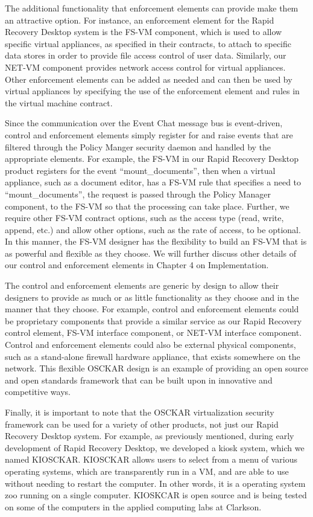 The additional functionality that enforcement elements can provide make them an attractive option. For instance, an enforcement element for the Rapid Recovery Desktop system is the FS-VM component, which is used to allow specific virtual appliances, as specified in their contracts, to attach to specific data stores in order to provide file access control of user data. Similarly, our NET-VM component provides network access control for virtual appliances. Other enforcement elements can be added as needed and can then be used by virtual appliances by specifying the use of the enforcement element and rules in the virtual machine contract.

Since the communication over the Event Chat message bus is event-driven, control and enforcement elements simply register for and raise events that are filtered through the Policy Manger security daemon and handled by the appropriate elements. For example, the FS-VM in our Rapid Recovery Desktop product registers for the event ``mount\_documents'', then when a virtual appliance, such as a document editor, has a FS-VM rule that specifies a need to ``mount\_documents'', the request is passed through the Policy Manager component, to the FS-VM so that the processing can take place. Further, we require other FS-VM contract options, such as the access type (read, write, append, etc.) and allow other options, such as the rate of access, to be optional. In this manner, the FS-VM designer has the flexibility to build an FS-VM that is as powerful and flexible as they choose. We will further discuss other details of our control and enforcement elements in Chapter 4 on Implementation.

The control and enforcement elements are generic by design to allow their designers to provide as much or as little functionality as they choose and in the manner that they choose. For example, control and enforcement elements could be proprietary components that provide a similar service as our Rapid Recovery control element, FS-VM interface component, or NET-VM interface component. Control and enforcement elements could also be external physical components, such as a stand-alone firewall hardware appliance, that exists somewhere on the network. This flexible OSCKAR design is an example of providing an open source and open standards framework that can be built upon in innovative and competitive ways.

Finally, it is important to note that the OSCKAR virtualization security framework can be used for a variety of other products, not just our Rapid Recovery Desktop system. For example, as previously mentioned, during early development of Rapid Recovery Desktop, we developed a kiosk system, which we named KIOSCKAR. KIOSCKAR allows users to select from a menu of various operating systems, which are transparently run in a VM, and are able to use without needing to restart the computer. In other words, it is a operating system zoo running on a single computer. KIOSKCAR is open source and is being tested on some of the computers in the applied computing labs at Clarkson.


